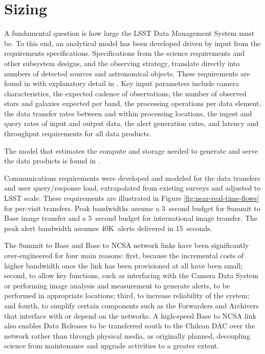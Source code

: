 \section{Sizing}\label{sizing}

A fundamental question is how large the LSST Data Management System must be. To
this end, an analytical model has been developed driven by input from
the requirements specifications. Specifications from the science requirements
and other subsystem designs, and the observing strategy, translate directly
into numbers of detected sources and astronomical objects.
These requirements are found in \cite{LSE-81} with explanatory detail in \cite{LSE-82}.
Key input parameters include camera characteristics, the expected cadence of
observations, the number of observed stars and galaxies expected per band, the
processing operations per data element, the data transfer rates between and
within processing locations, the ingest and query rates of input and output
data, the alert generation rates, and latency and throughput requirements for
all data products.

The model that estimates the compute and storage needed to generate and serve the data products is found in \cite{DMTN-135}.

Communications requirements were developed and modeled for the data transfers
and user query/response load, extrapolated from existing surveys and adjusted
to LSST scale.  These requirements are illustrated in Figure
\ref{fig:near-real-time-flows} for per-visit transfers.  Peak bandwidths assume
a 3~second budget for Summit to Base image transfer and a 5~second budget for
international image transfer.
The peak alert bandwidth assumes 40K~alerts delivered in 15~seconds.

The Summit to Base and Base to NCSA network links have been significantly
over-engineered for four main reasons: first, because the incremental costs of
higher bandwidth once the link has been provisioned at all have been small;
second, to allow key functions, such as interfacing with the Camera Data System
or performing image analysis and measurement to generate alerts, to be
performed in appropriate locations; third, to increase reliability of the
system; and fourth, to simplify certain components such as the Forwarders and
Archivers that interface with or depend on the networks.  A high-speed Base to
NCSA link also enables Data Releases to be transferred south to the Chilean DAC
over the network rather than through physical media, as originally planned,
decoupling science from maintenance and upgrade activities to a greater extent.

